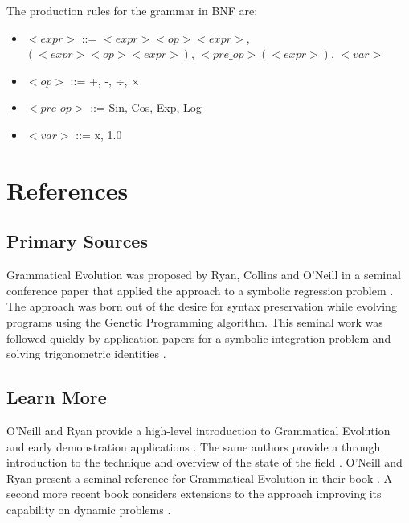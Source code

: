 \documentclass[a4paper, 11pt]{article}
\begin{document}
The production rules for the grammar in BNF are:
\begin{itemize}
	\item $<expr>$ ::= $<expr><op><expr>$, $(<expr><op><expr>)$, $<pre\_op>(<expr>)$, $<var>$
	\item $<op>$ ::= +, -, $\div$, $\times$
	\item $<pre\_op>$ ::= Sin, Cos, Exp, Log
	\item $<var>$ ::= x, 1.0
\end{itemize}







\section{References}
\label{sec:references}

% 
% 
\subsection{Primary Sources}
Grammatical Evolution was proposed by Ryan, Collins and O'Neill in a seminal conference paper that applied the approach to a symbolic regression problem \cite{Ryan1998a}. 
The approach was born out of the desire for syntax preservation while evolving programs using the Genetic Programming algorithm.
This seminal work was followed quickly by application papers for a symbolic integration problem \cite{O'Neill1998, O'Neill1998a} and solving trigonometric identities \cite{Ryan1998}.

% 
% 
\subsection{Learn More}
O'Neill and Ryan provide a high-level introduction to Grammatical Evolution and early demonstration applications \cite{O'Neill1999}. The same authors provide a through introduction to the technique and overview of the state of the field \cite{O'Neill2001}.
O'Neill and Ryan present a seminal reference for Grammatical Evolution in their book \cite{O'Neill2003}. A second more recent book considers extensions to the approach improving its capability on dynamic problems \cite{Dempsey2009}. 
\end{document}
